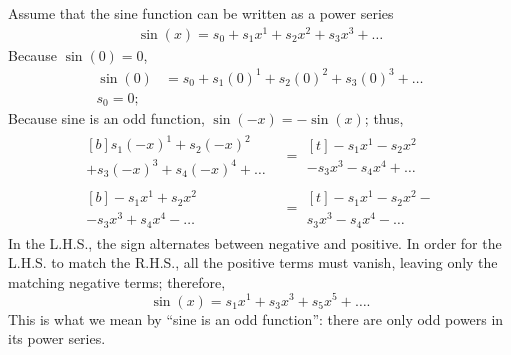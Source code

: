 Assume that the sine function can be written as a power series
\begin{align}
	\sin(x) = s_0 + s_1x^1 + s_2x^2 + s_3x^3 + \dots
\end{align}
Because $\sin(0) = 0$,
\begin{align}
	\sin(0) & = s_0 + s_1(0)^1 + s_2(0)^2 + s_3(0)^3 + \dots \\
	s_0 = 0;
\end{align}
Because sine is an odd function, $\sin(-x) = -\sin(x)$; thus,
\begin{align}
	\begin{multlined}[b]
		s_1(-x)^1 + s_2(-x)^2 \\
		+ s_3(-x)^3 + s_4(-x)^4 + \dots
	\end{multlined} & =
	\begin{multlined}[t]
		-s_1x^1 - s_2x^2 \\
		- s_3x^3 - s_4x^4 + \dots
	\end{multlined}       \\
	\begin{multlined}[b]
		-s_1x^1 + s_2x^2 \\
		- s_3x^3 + s_4x^4 - \dots
	\end{multlined}       & =
	\begin{multlined}[t]
		-s_1x^1 - s_2x^2 - \\
		s_3x^3 - s_4x^4 - \dots
	\end{multlined}
\end{align}
In the L.H.S., the sign alternates between negative and positive. In order for the L.H.S. to match the R.H.S., all the positive terms must vanish, leaving only the matching negative terms; therefore,
\begin{equation}
	\sin(x) = s_1x^1 + s_3x^3 + s_5x^5 + \dots.
\end{equation}
This is what we mean by \enquote{sine is an odd function}: there are only odd powers in its power series.

